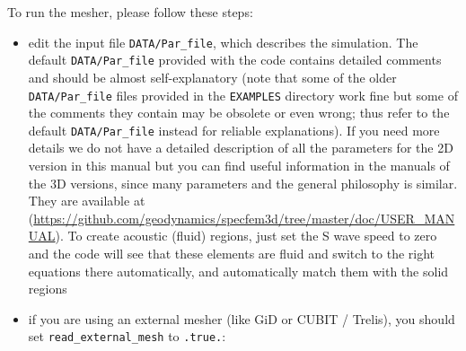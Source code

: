 \documentclass[oneside,english,onecolumn,letterpaper]{book}
\newcommand{\urlwithparentheses}[1]{(\url{#1})}
\begin{document}
To run the mesher, please follow these steps:
%
\begin{itemize}

\item edit the input file \texttt{DATA/Par\_file}, which describes the simulation.
The default \texttt{DATA/Par\_file} provided with the code contains detailed comments and should be almost self-explanatory
(note that some of the older \texttt{DATA/Par\_file} files provided in the \texttt{EXAMPLES} directory work fine but some of the comments
they contain may be obsolete or even wrong; thus refer to the default \texttt{DATA/Par\_file} instead for reliable explanations).
If you need more details we do not have a detailed description of all the parameters for the 2D version in this manual
but you can find useful information in the manuals of the 3D versions, since many parameters and the general philosophy is similar. They are available at
\urlwithparentheses{https://github.com/geodynamics/specfem3d/tree/master/doc/USER_MANUAL}.
To create acoustic (fluid) regions, just set the S wave speed to zero and the code will see that these elements are fluid and switch to the right equations there automatically, and automatically match them with the solid regions

\item if you are using an external mesher (like GiD or CUBIT / Trelis), you should set \texttt{read\_external\_mesh} to \texttt{.true.}:
\end{itemize}
\end{document}
